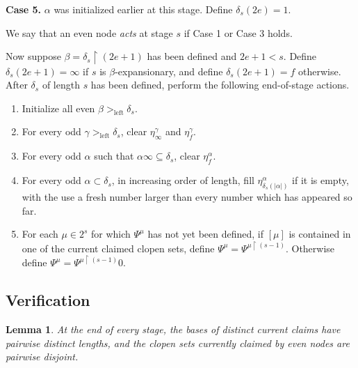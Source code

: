 \documentclass[10pt,a4paper]{amsart}
\newtheorem{lemma}[theorem]{Lemma}
\begin{document}
\textbf{Case 5.}  $\alpha$ was initialized earlier at this stage.  Define
$\delta_s(2e)=1$.

We say that an even node \emph{acts} at stage $s$ if Case 1 or Case 3 holds.

Now suppose $\beta=\delta_s\upharpoonright(2e+1)$ has been defined and
$2e+1<s$.  Define $\delta_s(2e+1)=\infty$ if $s$ is
$\beta$-expansionary, and define $\delta_s(2e+1)=f$ otherwise.
After $\delta_s$ of length $s$ has been defined, perform the following end-of-stage actions.

\begin{enumerate}[label=(\roman*)]
\item Initialize all even $\beta>_{\mathrm{left}}\delta_s$.
\item For every odd $\gamma>_{\mathrm{left}}\delta_s$, clear
      $\eta_\infty^\gamma$ and $\eta_f^\gamma$.
\item For every odd $\alpha$ such that $\alpha\infty\subseteq\delta_s$, clear $\eta_f^\alpha$.
\item For every odd $\alpha\subset\delta_s$, in increasing order of length,
      fill $\eta_{\delta_s(|\alpha|)}^\alpha$ if it is empty, with the use a fresh
      number larger than every number which has appeared so far.
\item For each $\mu\in2^s$ for which $\Psi^\mu$ has not yet been defined, if
      $[\mu]$ is contained in one of the current claimed clopen sets, define $\Psi^\mu=\Psi^{\mu\upharpoonright(s-1)}$. Otherwise define $\Psi^\mu=\Psi^{\mu\upharpoonright(s-1)}0$.
    
\end{enumerate}

\subsection{Verification}

\begin{lemma}\label{claims-antichain-main}
At the end of every stage, the bases of distinct current claims have pairwise
distinct lengths, and the clopen sets currently claimed by even nodes are pairwise
disjoint.
\end{lemma}
\end{document}
